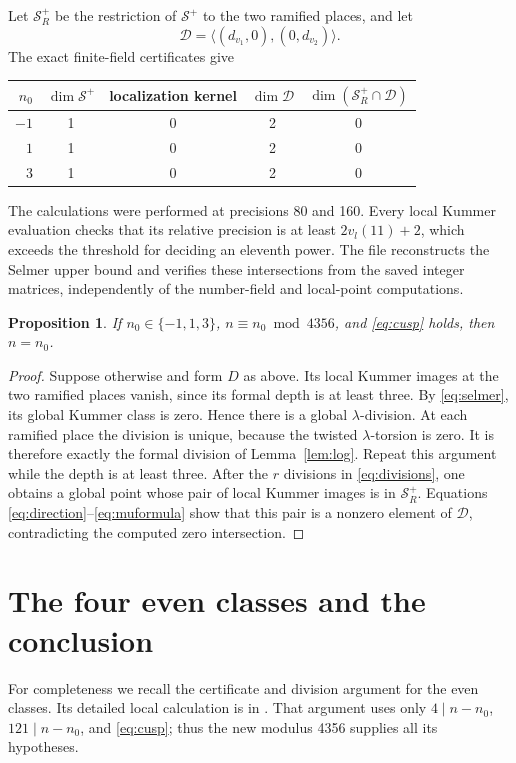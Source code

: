 \documentclass[11pt]{article}
\newtheorem{proposition}[theorem]{Proposition}
\begin{document}
Let \(\mathcal S_R^+\) be the restriction of \(\mathcal S^+\) to the
two ramified places, and let
\[
 \mathcal D=\langle(d_{v_1},0),(0,d_{v_2})\rangle.
\]
The exact finite-field certificates give
\begin{center}\begin{tabular}{rcccc}\toprule
\(n_0\)&\(\dim\mathcal S^+\)&localization kernel&\(\dim\mathcal D\)&
\(\dim(\mathcal S_R^+\cap\mathcal D)\)\\\midrule
\(-1\)&1&0&2&0\\
\(1\)&1&0&2&0\\
\(3\)&1&0&2&0\\\bottomrule
\end{tabular}\end{center}
The calculations were performed at precisions 80 and 160. Every local
Kummer evaluation checks that its relative precision is at least
\(2v_l(11)+2\), which exceeds the threshold for deciding an eleventh
power. The file  reconstructs the Selmer upper
bound and verifies these intersections from the saved integer matrices,
independently of the number-field and local-point computations.

\begin{proposition}\label{prop:odd}
If \(n_0\in\{-1,1,3\}\), \(n\equiv n_0\bmod4356\), and
\eqref{eq:cusp} holds, then \(n=n_0\).
\end{proposition}
\begin{proof}
Suppose otherwise and form \(D\) as above. Its local Kummer images at
the two ramified places vanish, since its formal depth is at least
three. By \eqref{eq:selmer}, its global Kummer class is zero. Hence
there is a global \(\lambda\)-division.
At each ramified place the division is unique, because the twisted
\(\lambda\)-torsion is zero. It is therefore exactly the formal
division of Lemma~\ref{lem:log}.
Repeat this argument while the depth is at least three. After the
\(r\) divisions in \eqref{eq:divisions}, one obtains a global point
whose pair of local Kummer images is in \(\mathcal S_R^+\).
Equations \eqref{eq:direction}--\eqref{eq:muformula} show that this
pair is a nonzero element of \(\mathcal D\), contradicting the
computed zero intersection.
\end{proof}

\section{The four even classes and the conclusion}
For completeness we recall the certificate and division argument for
the even classes. Its detailed local calculation is in
. That argument uses only
\(4\mid n-n_0\), \(121\mid n-n_0\), and \eqref{eq:cusp}; thus the
new modulus 4356 supplies all its hypotheses.
\end{document}
